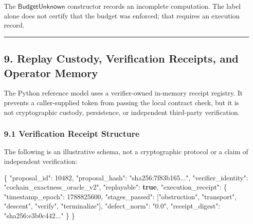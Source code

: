 \documentclass[
  10pt,
]{article}
\newenvironment{Shaded}{}{}
\newcommand{\DataTypeTok}[1]{\textcolor[rgb]{0.56,0.13,0.00}{#1}}
\newcommand{\DecValTok}[1]{\textcolor[rgb]{0.25,0.63,0.44}{#1}}
\newcommand{\FunctionTok}[1]{\textcolor[rgb]{0.02,0.16,0.49}{#1}}
\newcommand{\KeywordTok}[1]{\textcolor[rgb]{0.00,0.44,0.13}{\textbf{#1}}}
\newcommand{\OtherTok}[1]{\textcolor[rgb]{0.00,0.44,0.13}{#1}}
\newcommand{\StringTok}[1]{\textcolor[rgb]{0.25,0.44,0.63}{#1}}
\begin{document}
The \hypertarget{math-E0147-0208}{}{\(\mathsf{BudgetUnknown}\)} constructor records an incomplete computation. The label alone does not certify that the budget was enforced; that requires an execution record.

\begin{center}\rule{0.5\linewidth}{0.5pt}\end{center}

\subsection{9. Replay Custody, Verification Receipts, and Operator Memory}\label{replay-custody-verification-receipts-and-operator-memory}

The Python reference model uses a verifier-owned in-memory receipt registry. It prevents a caller-supplied token from passing the local contract check, but it is not cryptographic custody, persistence, or independent third-party verification.

\subsubsection{9.1 Verification Receipt Structure}\label{verification-receipt-structure}

The following is an illustrative schema, not a cryptographic protocol or a claim of independent verification:

\begin{Shaded}
\begin{Highlighting}[]
\FunctionTok{\{}
  \DataTypeTok{"proposal\_id"}\FunctionTok{:} \DecValTok{10482}\FunctionTok{,}
  \DataTypeTok{"proposal\_hash"}\FunctionTok{:} \StringTok{"sha256:7f83b165..."}\FunctionTok{,}
  \DataTypeTok{"verifier\_identity"}\FunctionTok{:} \StringTok{"cochain\_exactness\_oracle\_v2"}\FunctionTok{,}
  \DataTypeTok{"replayable"}\FunctionTok{:} \KeywordTok{true}\FunctionTok{,}
  \DataTypeTok{"execution\_receipt"}\FunctionTok{:} \FunctionTok{\{}
    \DataTypeTok{"timestamp\_epoch"}\FunctionTok{:} \DecValTok{1788825600}\FunctionTok{,}
    \DataTypeTok{"stages\_passed"}\FunctionTok{:} \OtherTok{[}\StringTok{"obstruction"}\OtherTok{,} \StringTok{"transport"}\OtherTok{,} \StringTok{"descent"}\OtherTok{,} \StringTok{"verify"}\OtherTok{,} \StringTok{"terminalize"}\OtherTok{]}\FunctionTok{,}
    \DataTypeTok{"defect\_norm"}\FunctionTok{:} \StringTok{"0.0"}\FunctionTok{,}
    \DataTypeTok{"receipt\_digest"}\FunctionTok{:} \StringTok{"sha256:e3b0c442..."}
  \FunctionTok{\}}
\FunctionTok{\}}
\end{Highlighting}
\end{Shaded}
\end{document}
